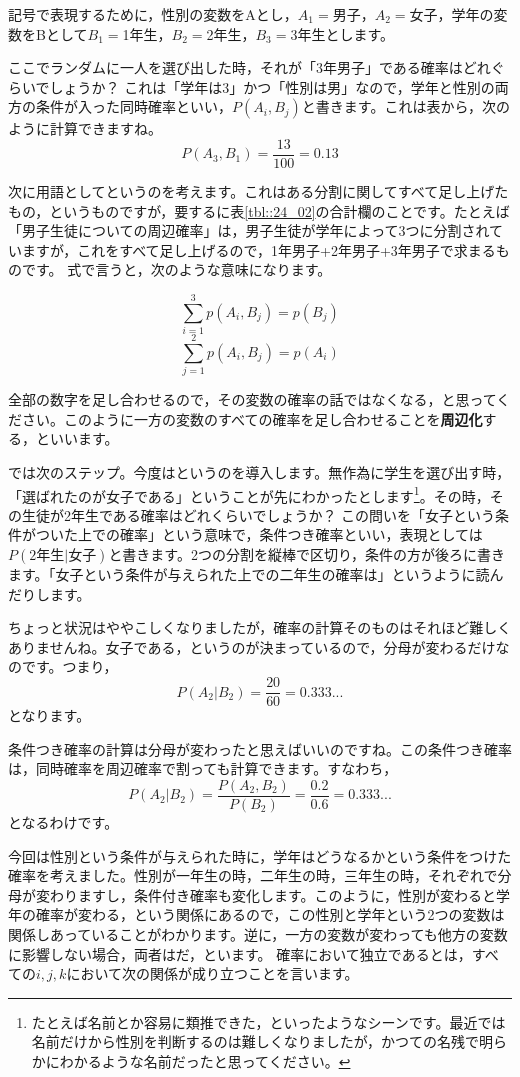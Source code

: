 \documentclass{ltjsbook}
\begin{document}
記号で表現するために，性別の変数をAとし，$A_1=$男子，$A_2=$女子，学年の変数をBとして$B_1=$1年生，$B_2=$2年生，$B_3=$3年生とします。

ここでランダムに一人を選び出した時，それが「3年男子」である確率はどれぐらいでしょうか？ これは「学年は3」かつ「性別は男」なので，学年と性別の両方の条件が入った同時確率といい，$P(A_i,B_j)$と書きます。これは表から，次のように計算できますね。
\[ P(A_3,B_1)= \frac{13}{100}=0.13 \]

次に用語としてというのを考えます。これはある分割に関してすべて足し上げたもの，というものですが，要するに表\ref{tbl::24_02}の合計欄のことです。たとえば「男子生徒についての周辺確率」は，男子生徒が学年によって3つに分割されていますが，これをすべて足し上げるので，1年男子+2年男子+3年男子で求まるものです。
式で言うと，次のような意味になります。

\[ \sum_{i=1}^3 p(A_i,B_j) = p(B_j) \]
\[ \sum_{j=1}^2 p(A_i,B_j) = p(A_i) \]

全部の数字を足し合わせるので，その変数の確率の話ではなくなる，と思ってください。このように一方の変数のすべての確率を足し合わせることを\textbf{周辺化}する，といいます。

では次のステップ。今度はというのを導入します。無作為に学生を選び出す時，「選ばれたのが女子である」ということが先にわかったとします\footnote{たとえば名前とか容易に類推できた，といったようなシーンです。最近では名前だけから性別を判断するのは難しくなりましたが，かつての名残で明らかにわかるような名前だったと思ってください。}。その時，その生徒が2年生である確率はどれくらいでしょうか？ この問いを「女子という条件がついた上での確率」という意味で，条件つき確率といい，表現としては$P(\mbox{2年生}|\mbox{女子})$と書きます。2つの分割を縦棒で区切り，条件の方が後ろに書きます。「女子という条件が与えられた上での二年生の確率は」というように読んだりします。

ちょっと状況はややこしくなりましたが，確率の計算そのものはそれほど難しくありませんね。女子である，というのが決まっているので，分母が変わるだけなのです。つまり，
\[P(A_2|B_2)=\frac{20}{60}=0.333... \]
となります。

条件つき確率の計算は分母が変わったと思えばいいのですね。この条件つき確率は，同時確率を周辺確率で割っても計算できます。すなわち，
\[ P(A_2|B_2) = \frac{P(A_2,B_2)}{P(B_2)}=\frac{0.2}{0.6}=0.333... \]
となるわけです。

今回は性別という条件が与えられた時に，学年はどうなるかという条件をつけた確率を考えました。性別が一年生の時，二年生の時，三年生の時，それぞれで分母が変わりますし，条件付き確率も変化します。このように，性別が変わると学年の確率が変わる，という関係にあるので，この性別と学年という2つの変数は関係しあっていることがわかります。逆に，一方の変数が変わっても他方の変数に影響しない場合，両者はだ，といます。
確率において独立であるとは，すべての$i,j,k$において次の関係が成り立つことを言います。
\end{document}
